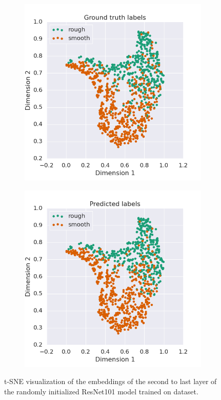 \documentclass{aci}
\numberwithin{equation}{section}
\begin{document}
\begin{figure}[h]
    \centering
    \begin{subfigure}{.45\textwidth}
        \includegraphics[width=1\linewidth]{thesis_assets/plots/resnet101_gt_tsne.png}
    \end{subfigure}
    \begin{subfigure}{.45\textwidth}
        \includegraphics[width=1\linewidth]{thesis_assets/plots/resnet101_pred_tsne.png}
    \end{subfigure}
    \caption{t-SNE visualization of the embeddings of the second to last layer
        of the randomly initialized ResNet101 model trained on dataset.}
    \label{fig:resnet101_tsne}
\end{figure}
\end{document}
